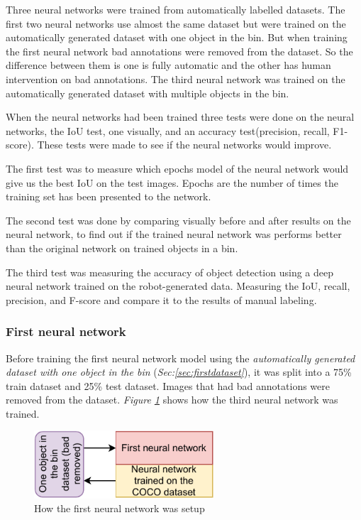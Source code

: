 Three neural networks were trained from automatically labelled datasets. 
The first two neural networks use almost the same dataset but were trained on the automatically generated dataset with one object in the bin. But when training the first neural network bad annotations were removed from the dataset. 
So the difference between them is one is fully automatic and the other has human intervention on bad annotations.
The third neural network was trained on the automatically generated dataset with multiple objects in the bin.

When the neural networks had been trained three tests were done on the neural networks, the IoU test, one visually, and an accuracy test(precision, recall, F1-score). These tests were made to see if the neural networks would improve. 

The first test was to measure which epochs model of the neural network would give us the best IoU on the test images. Epochs are the number of times the training set has been presented to the network.

The second test was done by comparing visually before and after results on the neural network, to find out if the trained neural network was performs better than the original network on trained objects in a bin. 

The third test was measuring the accuracy of object detection using a deep neural network trained on the robot-generated data. Measuring the IoU, recall, precision, and F-score and compare it to the results of manual labeling. 


\subsubsection{First neural network}
Before training the first neural network model using the \textit{automatically generated dataset with one object in the bin} (\textit{Sec:\ref{sec:firstdataset}}), it was split into a 75\% train dataset and 25\% test dataset. Images that had bad annotations were removed from the dataset. \textit{Figure \ref{fig:firstneural}} shows how the third neural network was trained.

\begin{figure}[h]
 \centering
 \includegraphics[width=0.6\textwidth]{graphics/results/firstneural.pdf}
 \caption{How the first neural network was setup}
 \label{fig:firstneural}
\end{figure}

